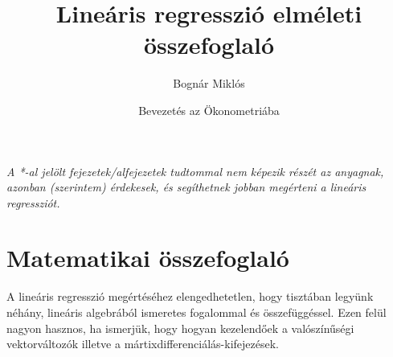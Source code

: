 \documentclass[14p]{report}
\title{Lineáris regresszió elméleti összefoglaló}
\author{Bognár Miklós}
\date{Bevezetés az Ökonometriába}
\begin{document}
	\maketitle
	\tableofcontents
	\vspace{2cm}
	\emph{A *-al jelölt fejezetek/alfejezetek tudtommal nem képezik részét az anyagnak, azonban (szerintem) érdekesek, és segíthetnek jobban megérteni a lineáris regressziót.}
	\newpage
	\chapter{Matematikai összefoglaló}
	A lineáris regresszió megértéséhez elengedhetetlen, hogy tisztában legyünk néhány, lineáris algebrából ismeretes fogalommal és összefüggéssel. Ezen felül nagyon hasznos, ha ismerjük, hogy hogyan kezelendőek a valószínűségi vektorváltozók illetve a mártixdifferenciálás-kifejezések.  
	
\end{document}

